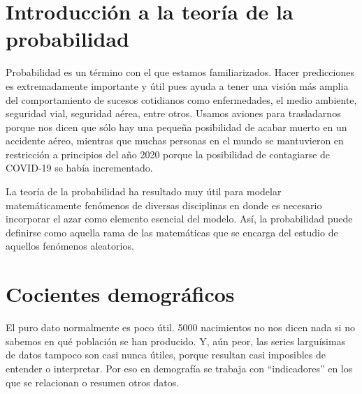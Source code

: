\documentclass[a4paper,11pt]{book}
\begin{document}
\chapter{Introducción a la teoría de la probabilidad}
    Probabilidad es un término con el que estamos familiarizados. Hacer predicciones es extremadamente importante y útil pues ayuda a tener una visión más amplia del comportamiento de sucesos cotidianos como enfermedades, el medio ambiente, seguridad vial, seguridad aérea, entre otros.
    Usamos aviones para trasladarnos porque nos dicen que sólo hay una pequeña posibilidad de acabar muerto en un accidente aéreo, mientras que muchas personas en el mundo se mantuvieron en restricción a principios del año 2020 porque la posibilidad de contagiarse de COVID-19 se había incrementado.
    
    La teoría de la probabilidad ha resultado muy útil para modelar
    matemáticamente fenómenos de diversas disciplinas en donde es necesario incorporar el azar como elemento esencial del modelo. Así, la probabilidad puede definirse como
    aquella rama de las matemáticas que se encarga del estudio de aquellos fenómenos aleatorios.
    
    
    
    
    
    

\chapter{Cocientes demográficos}
    El puro dato normalmente es poco útil. 5000 nacimientos no nos dicen nada si no sabemos en qué población se han producido. Y, aún peor, las series larguísimas de datos tampoco son casi nunca útiles, porque resultan casi imposibles de entender o interpretar. Por eso en demografía se trabaja con “indicadores” en los que se relacionan o resumen otros datos.
    
    
\end{document}
